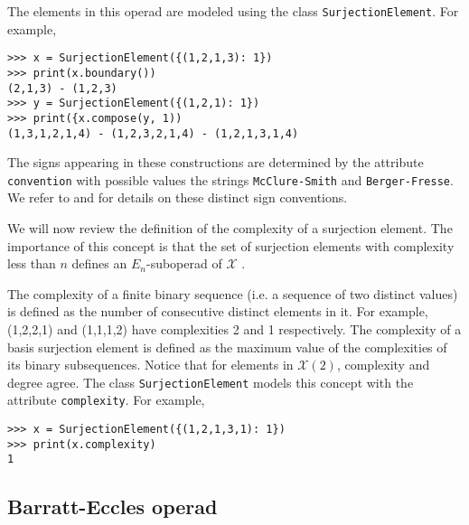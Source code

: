 \documentclass{amsart}
\begin{document}
The elements in this operad are modeled using the class \texttt{SurjectionElement}. For example,
\begin{Verbatim}[frame=single, samepage=true]
>>> x = SurjectionElement({(1,2,1,3): 1})
>>> print(x.boundary())
(2,1,3) - (1,2,3)
>>> y = SurjectionElement({(1,2,1): 1})
>>> print({x.compose(y, 1))
(1,3,1,2,1,4) - (1,2,3,2,1,4) - (1,2,1,3,1,4)
\end{Verbatim}

The signs appearing in these constructions are determined by the attribute \texttt{convention} with possible values the strings \texttt{McClure-Smith} and \texttt{Berger-Fresse}. We refer to \cite{McClureSmith03} and \cite{BergerFresse04} for details on these distinct sign conventions.

We will now review the definition of the complexity of a surjection element. The importance of this concept is that the set of surjection elements with complexity less than $n$ defines an $E_n$-suboperad of $\mathcal X$ \cite{McClureSmith03}.

The complexity of a finite binary sequence (i.e. a sequence of two distinct values) is defined as the number of consecutive distinct elements in it. For example, (1,2,2,1) and (1,1,1,2) have complexities 2 and 1 respectively. The complexity of a basis surjection element is defined as the maximum value of the complexities of its binary subsequences. Notice that for elements in $\mathcal X(2)$, complexity and degree agree. The class \texttt{SurjectionElement} models this concept with the attribute \texttt{complexity}. For example,

\begin{Verbatim}[frame=single, samepage=true]
>>> x = SurjectionElement({(1,2,1,3,1): 1})
>>> print(x.complexity)
1
\end{Verbatim}

\subsection{Barratt-Eccles operad}
\end{document}
